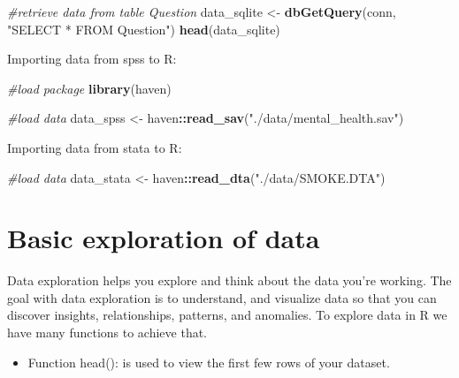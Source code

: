 \documentclass[
]{book}
\newenvironment{Shaded}{\begin{snugshade}}{\end{snugshade}}
\newcommand{\CommentTok}[1]{\textcolor[rgb]{0.56,0.35,0.01}{\textit{#1}}}
\newcommand{\FunctionTok}[1]{\textcolor[rgb]{0.13,0.29,0.53}{\textbf{#1}}}
\newcommand{\NormalTok}[1]{#1}
\newcommand{\OtherTok}[1]{\textcolor[rgb]{0.56,0.35,0.01}{#1}}
\newcommand{\SpecialCharTok}[1]{\textcolor[rgb]{0.81,0.36,0.00}{\textbf{#1}}}
\newcommand{\StringTok}[1]{\textcolor[rgb]{0.31,0.60,0.02}{#1}}
\providecommand{\tightlist}{%
  \setlength{\itemsep}{0pt}\setlength{\parskip}{0pt}}
\begin{document}
\begin{Shaded}
\begin{Highlighting}[]
\CommentTok{\#retrieve data from table Question}
\NormalTok{data\_sqlite }\OtherTok{\textless{}{-}} \FunctionTok{dbGetQuery}\NormalTok{(conn, }\StringTok{"SELECT * FROM Question"}\NormalTok{)}
\FunctionTok{head}\NormalTok{(data\_sqlite)}
\end{Highlighting}
\end{Shaded}

Importing data from spss to R:

\begin{Shaded}
\begin{Highlighting}[]
\CommentTok{\#load package}
\FunctionTok{library}\NormalTok{(haven)}

\CommentTok{\#load data}
\NormalTok{data\_spss }\OtherTok{\textless{}{-}}\NormalTok{ haven}\SpecialCharTok{::}\FunctionTok{read\_sav}\NormalTok{(}\StringTok{"./data/mental\_health.sav"}\NormalTok{)}
\end{Highlighting}
\end{Shaded}

Importing data from stata to R:

\begin{Shaded}
\begin{Highlighting}[]
\CommentTok{\#load data}
\NormalTok{data\_stata }\OtherTok{\textless{}{-}}\NormalTok{ haven}\SpecialCharTok{::}\FunctionTok{read\_dta}\NormalTok{(}\StringTok{"./data/SMOKE.DTA"}\NormalTok{)}
\end{Highlighting}
\end{Shaded}

\hypertarget{basic-exploration-of-data}{%
\section{Basic exploration of data}\label{basic-exploration-of-data}}

Data exploration helps you explore and think about the data you're working. The goal with data exploration is to understand, and visualize data so that you can discover insights, relationships, patterns, and anomalies.
To explore data in R we have many functions to achieve that.

\begin{itemize}
\tightlist
\item
  Function head(): is used to view the first few rows of your dataset.
\end{itemize}
\end{document}
